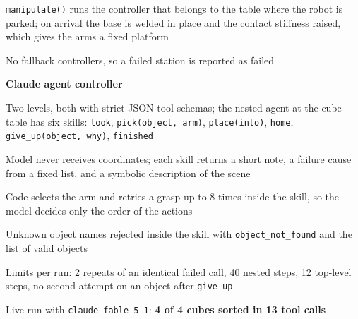 \documentclass[letterpaper,11pt]{article}
\newcommand{\subhead}[1]{\par\vspace{4pt}\textbf{#1}\par\nobreak\vspace{-1pt}}
\begin{document}
{{}\par\vspace{2pt}
\begin{points}
  \item \texttt{manipulate()} runs the controller that belongs to the table where the robot is parked; on arrival the base is welded in place and the contact stiffness raised, which gives the arms a fixed platform
  \item No fallback controllers, so a failed station is reported as failed
\end{points}

\subhead{Claude agent controller}
\begin{points}
  \item Two levels, both with strict JSON tool schemas; the nested agent at the cube table has six skills: \texttt{look}, \texttt{pick(object, arm)}, \texttt{place(into)}, \texttt{home}, \texttt{give\_up(object, why)}, \texttt{finished}
  \item Model never receives coordinates; each skill returns a short note, a failure cause from a fixed list, and a symbolic description of the scene
  \item Code selects the arm and retries a grasp up to 8 times inside the skill, so the model decides only the order of the actions
  \item Unknown object names rejected inside the skill with \texttt{object\_not\_found} and the list of valid objects
  \item Limits per run: 2 repeats of an identical failed call, 40 nested steps, 12 top-level steps, no second attempt on an object after \texttt{give\_up}
  \item Live run with \texttt{claude-fable-5-1}: \textbf{4 of 4 cubes sorted in 13 tool calls}
\end{points}

}
\end{document}
